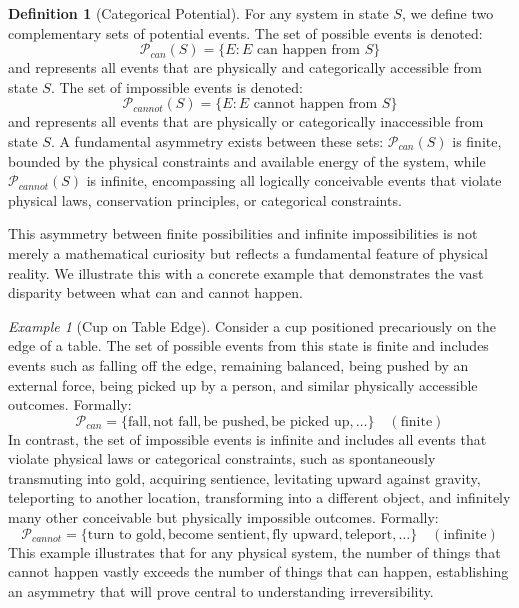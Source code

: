 \documentclass[12pt,a4paper]{article}
\theoremstyle{definition}
\newtheorem{definition}[theorem]{Definition}
\theoremstyle{remark}
\newtheorem{example}{Example}
\begin{document}
\begin{definition}[Categorical Potential]
For any system in state $S$, we define two complementary sets of potential events. The set of possible events is denoted:
\begin{equation}
\mathcal{P}_{can}(S) = \{E : E \text{ can happen from } S\}
\end{equation}
and represents all events that are physically and categorically accessible from state $S$. The set of impossible events is denoted:
\begin{equation}
\mathcal{P}_{cannot}(S) = \{E : E \text{ cannot happen from } S\}
\end{equation}
and represents all events that are physically or categorically inaccessible from state $S$. A fundamental asymmetry exists between these sets: $\mathcal{P}_{can}(S)$ is finite, bounded by the physical constraints and available energy of the system, while $\mathcal{P}_{cannot}(S)$ is infinite, encompassing all logically conceivable events that violate physical laws, conservation principles, or categorical constraints.
\end{definition}

This asymmetry between finite possibilities and infinite impossibilities is not merely a mathematical curiosity but reflects a fundamental feature of physical reality. We illustrate this with a concrete example that demonstrates the vast disparity between what can and cannot happen.

\begin{example}[Cup on Table Edge]
Consider a cup positioned precariously on the edge of a table. The set of possible events from this state is finite and includes events such as falling off the edge, remaining balanced, being pushed by an external force, being picked up by a person, and similar physically accessible outcomes. Formally:
\begin{equation}
\mathcal{P}_{can} = \{\text{fall}, \text{not fall}, \text{be pushed}, \text{be picked up}, \ldots\} \quad (\text{finite})
\end{equation}
In contrast, the set of impossible events is infinite and includes all events that violate physical laws or categorical constraints, such as spontaneously transmuting into gold, acquiring sentience, levitating upward against gravity, teleporting to another location, transforming into a different object, and infinitely many other conceivable but physically impossible outcomes. Formally:
\begin{equation}
\mathcal{P}_{cannot} = \{\text{turn to gold}, \text{become sentient}, \text{fly upward}, \text{teleport}, \ldots\} \quad (\text{infinite})
\end{equation}
This example illustrates that for any physical system, the number of things that cannot happen vastly exceeds the number of things that can happen, establishing an asymmetry that will prove central to understanding irreversibility.
\end{example}
\end{document}
